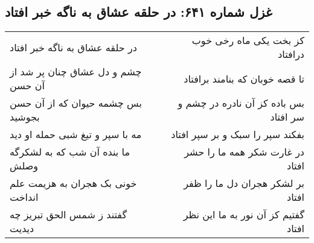 \begin{center}
\section*{غزل شماره ۶۴۱: در حلقه عشاق به ناگه خبر افتاد}
\label{sec:0641}
\begin{longtable}{l p{0.5cm} r}
در حلقه عشاق به ناگه خبر افتاد
&&
کز بخت یکی ماه رخی خوب درافتاد
\\
چشم و دل عشاق چنان پر شد از آن حسن
&&
تا قصه خوبان که بنامند برافتاد
\\
بس چشمه حیوان که از آن حسن بجوشید
&&
بس باده کز آن نادره در چشم و سر افتاد
\\
مه با سپر و تیغ شبی حمله او دید
&&
بفکند سپر را سبک و بر سپر افتاد
\\
ما بنده آن شب که به لشکرگه وصلش
&&
در غارت شکر همه ما را حشر افتاد
\\
خونی بک هجران به هزیمت علم انداخت
&&
بر لشکر هجران دل ما را ظفر افتاد
\\
گفتند ز شمس الحق تبریز چه دیدیت
&&
گفتیم کز آن نور به ما این نظر افتاد
\\
\end{longtable}
\end{center}
